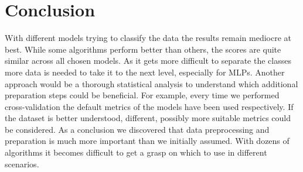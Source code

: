 \documentclass[twocolumn]{scrartcl}
\begin{document}
\section{Conclusion}
With different models trying to classify the data the results remain mediocre at best. While some algorithms perform better than others, the scores are quite similar across all chosen models. As it gets more difficult to separate the classes more data is needed to take it to the next level, especially for MLPs. Another approach would be a thorough statistical analysis to understand which additional preparation steps could be beneficial. For example, every time we performed cross-validation the default metrics of the models have been used respectively. If the dataset is better understood, different, possibly more suitable metrics could be considered. As a conclusion we discovered that data preprocessing and preparation is much more important than we initially assumed. With dozens of algorithms it becomes difficult to get a grasp on which to use in different scenarios.

\printbibliography
\end{document}
